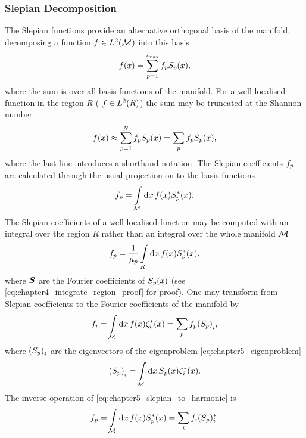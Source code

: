 \subsubsection{Slepian Decomposition}

The Slepian functions provide an alternative orthogonal basis of the manifold, decomposing a function \(f \in L^{2}(\mathcal{M})\) into this basis
%
\begin{equation}
	f(x)
	= \sum\limits_{p=1}^{i_{\text{max}}} {f}_{p} {S}_{p}(x),
\end{equation}
%
where the sum is over all basis functions of the manifold.
For a well-localised function in the region \(R\) (\ie{} \(f \in L^{2}(R)\)) the sum may be truncated at the Shannon number
%
\begin{equation}
	f(x)
	\approx \sum\limits_{p=1}^{N} {f}_{p} {S}_{p}(x)
	= \displaystyle\sum\limits_{p} {f}_{p} {S}_{p}(x),
\end{equation}
%
where the last line introduces a shorthand notation.
The Slepian coefficients \({f}_{p}\) are calculated through the usual projection on to the basis functions
%
\begin{equation}
	{f}_{p}
	= \displaystyle\int\limits_{\mathcal{M}} \dd{x} f(x) {S}_{p}^{\ast}(x).
\end{equation}
%
The Slepian coefficients of a well-localised function may be computed with an integral over the region \(R\) rather than an integral over the whole manifold \(\mathcal{M}{}\)
%
\begin{equation}
	{f}_{p}
	= \frac{1}{{\mu}_{p}} \displaystyle\int\limits_{R} \dd{x} f(x) {S}_{p}^{\ast}(x),
\end{equation}
%
where \(\vb*{S}\) are the Fourier coefficients of \({S}_{p}(x)\) (see \cref{eq:chapter4_integrate_region_proof} for proof).
One may transform from Slepian coefficients to the Fourier coefficients of the manifold by
%
\begin{equation}\label{eq:chapter5_slepian_to_harmonic}
	f_{i}
	= \displaystyle\int\limits_{\mathcal{M}} \dd{x} f(x) \zeta_{i}^{\ast}(x)
	= \displaystyle\sum\limits_{p} {f}_{p} {({S}_{p})}_{i},
\end{equation}
%
where \({({S}_{p})}_{i}\) are the eigenvectors of the eigenproblem \cref{eq:chapter5_eigenproblem}
%
\begin{equation}
	{({S}_{p})}_{i}
	= \displaystyle\int\limits_{\mathcal{M}} \dd{x} {S}_{p}(x) \zeta_{i}^{\ast}(x).
\end{equation}
%
The inverse operation of \cref{eq:chapter5_slepian_to_harmonic} is
%
\begin{equation}
	{f}_{p}
	= \displaystyle\int\limits_{\mathcal{M}} \dd{x} f(x) {S}_{p}^{\ast}(x)
	= \displaystyle\sum\limits_{i} f_{i} ({S}_{p})^{\ast}_{i}.
\end{equation}

